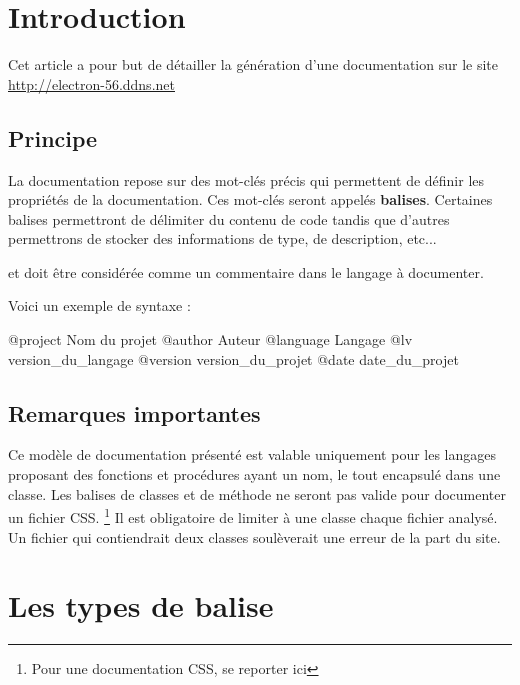 
\chapter{Introduction}

Cet article a pour but de détailler la génération d'une documentation sur le site \url{http://electron-56.ddns.net}

\section{Principe}

La documentation repose sur des mot-clés précis qui permettent de définir les propriétés de la documentation. Ces mot-clés seront appelés \textbf{balises}. \newline
Certaines balises permettront de délimiter du contenu de code tandis que d'autres permettrons de stocker des informations de type, de description, etc... \newline

 et doit être considérée comme un commentaire dans le langage à documenter. \newline


Voici un exemple de syntaxe : 


\begin{Bash}
@project Nom du projet
@author Auteur
@language Langage
@lv version_du_langage
@version version_du_projet
@date date_du_projet
\end{Bash}



\section{Remarques importantes}

Ce modèle de documentation présenté est valable uniquement pour les langages proposant des fonctions et procédures ayant un nom, le tout encapsulé dans une classe. \newline
Les balises de classes et de méthode ne seront pas valide pour documenter un fichier CSS. \footnote{Pour une documentation CSS, se reporter ici}
Il est obligatoire de limiter à une classe chaque fichier analysé.
Un fichier qui contiendrait deux classes soulèverait une erreur de la part du site.

\chapter{Les types de balise}


